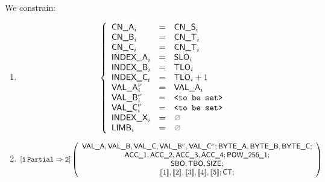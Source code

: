 \begin{center}
\end{center}

We constrain:
\begin{enumerate}
	\item 
		\[
			\left\{ \begin{array}{lclr}
				\cnA      _{i}       & = & \cnS_{i}            \\
				\cnB      _{i}       & = & \cnT_{i}            \\
				\cnC      _{i}       & = & \cnT_{i}            \\
				\indexA   _{i}       & = & \slo_{i}            \\
				\indexB   _{i}       & = & \tlo_{i}            \\
				\indexC   _{i}       & = & \tlo_{i} + 1        \\
				\valA     _{i}\new{} & = & \valA_{i}           \\
				\valB     _{i}\new{} & = & \valueToBeSet       \\
				\valC     _{i}\new{} & = & \valueToBeSet       \\
				\indexX   _{i}       & = & \nothing            \\
				\limb     _{i}       & = & \nothing            \\
			\end{array} \right.
		\]
	\item 
		\[
			\onePartialToTwo
			\left( \begin{array}{c}
				\valA{}, \valB{}, \valC{},
				\valB{}\new, \valC{}\new;
				\BYTEA{}, \BYTEB{}, \BYTEC{};
				\\
				\acc{1}, \acc{2}, \acc{3}, \acc{4}; \pow{1};
				\\
				\sbo{}, \tbo{}, \size{};
				\\
				\bit{1}, \bit{2}, \bit{3}, \bit{4}, \bit{5}; \ct{};
			\end{array} \right)
		\]
\end{enumerate}
